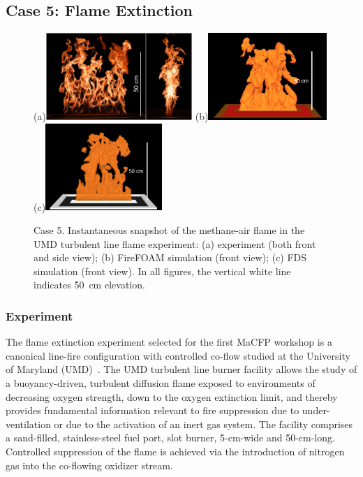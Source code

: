 
\subsection{Case 5: Flame Extinction} \label{sec:flame_extinction}

\begin{figure}
\centering
(a)\includegraphics[height=1.3in]{Figures/Case5-Fig1a.png}
(b)\includegraphics[height=1.3in]{Figures/Case5-Fig1b.png}
(c)\includegraphics[height=1.3in]{Figures/Case5-Fig1c.png}
\caption{Case 5. Instantaneous snapshot of the methane-air flame in the UMD turbulent line flame experiment: (a) experiment (both front and side view); (b) FireFOAM simulation (front view); (c) FDS simulation (front view). In all figures, the vertical white line indicates 50~cm elevation.}
\label{fig:Case5-Fig1}
\end{figure}

\subsubsection{Experiment}

The flame extinction experiment selected for the first MaCFP workshop is a canonical line-fire configuration with controlled co-flow studied at the University of Maryland (UMD)~\cite{Case5_EXP_1,Case5_EXP_2,Case5_EXP_3}. The UMD turbulent line burner facility allows the study of a buoyancy-driven, turbulent diffusion flame exposed to environments of decreasing oxygen strength, down to the oxygen extinction limit, and thereby provides fundamental information relevant to fire suppression due to under-ventilation or due to the activation of an inert gas system. The facility comprises a sand-filled, stainless-steel fuel port, slot burner, 5-cm-wide and 50-cm-long. Controlled suppression of the flame is achieved via the introduction of nitrogen gas into the co-flowing oxidizer stream.

